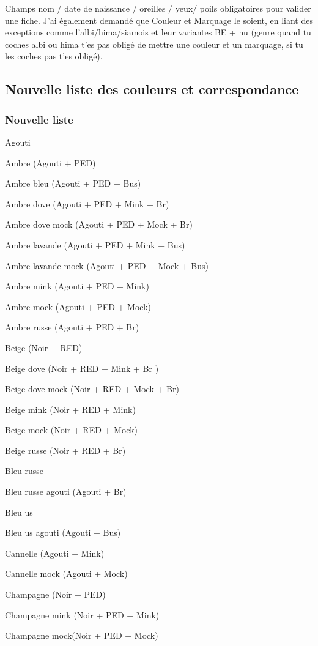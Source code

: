 \documentclass[a4paper,10pt]{article}
\begin{document}
Champs nom / date de naissance / oreilles / yeux/ poils obligatoires pour valider une fiche. J'ai également demandé que Couleur et Marquage le soient, en liant des exceptions comme l'albi/hima/siamois et leur variantes BE + nu (genre quand tu coches albi ou hima t'es pas obligé de mettre une couleur et un marquage, si tu les coches pas t'es obligé).

\subsection{Nouvelle liste des couleurs et correspondance}
\subsubsection{Nouvelle liste}
Agouti

Ambre (Agouti + PED)
 
Ambre bleu   (Agouti + PED + Bus)
 
Ambre dove   (Agouti + PED + Mink + Br)
 
Ambre dove mock   (Agouti + PED + Mock + Br)
 
Ambre lavande (Agouti + PED + Mink +   Bus)
 
Ambre lavande mock (Agouti + PED + Mock   + Bus)
 
Ambre mink   (Agouti + PED + Mink)
 
Ambre mock (Agouti + PED + Mock)
 
Ambre russe (Agouti + PED + Br)
 
Beige (Noir + RED)
 
Beige dove (Noir   + RED + Mink + Br )
 
Beige dove mock (Noir + RED + Mock + Br)
 
Beige mink (Noir   + RED + Mink)
 
Beige mock (Noir + RED + Mock)
 
Beige russe (Noir + RED + Br)
 
Bleu russe
 
Bleu russe agouti (Agouti + Br)
 
Bleu us
 
Bleu us agouti   (Agouti + Bus)
 
Cannelle (Agouti + Mink)
 
Cannelle mock (Agouti + Mock)
 
Champagne (Noir + PED)
 
Champagne mink (Noir + PED + Mink)

Champagne mock(Noir + PED + Mock)
 
\end{document}
